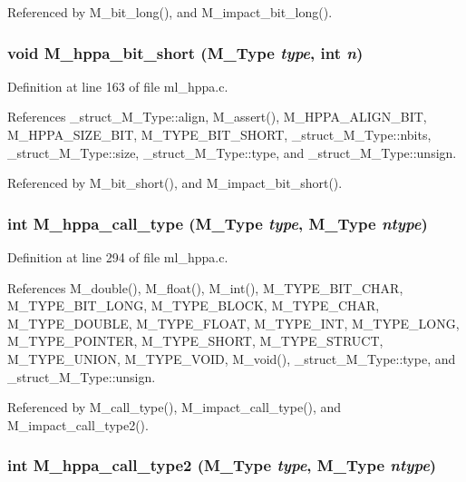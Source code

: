 Referenced by M\_\-bit\_\-long(), and M\_\-impact\_\-bit\_\-long().
\subsubsection{\setlength{\rightskip}{0pt plus 5cm}void M\_\-hppa\_\-bit\_\-short (\bf{M\_\-Type} {\em type}, int {\em n})}\label{ml__hppa_8c_c495d0f8270eaa8cdfd5ea0fda482197}




Definition at line 163 of file ml\_\-hppa.c.

References \_\-struct\_\-M\_\-Type::align, M\_\-assert(), M\_\-HPPA\_\-ALIGN\_\-BIT, M\_\-HPPA\_\-SIZE\_\-BIT, M\_\-TYPE\_\-BIT\_\-SHORT, \_\-struct\_\-M\_\-Type::nbits, \_\-struct\_\-M\_\-Type::size, \_\-struct\_\-M\_\-Type::type, and \_\-struct\_\-M\_\-Type::unsign.

Referenced by M\_\-bit\_\-short(), and M\_\-impact\_\-bit\_\-short().
\subsubsection{\setlength{\rightskip}{0pt plus 5cm}int M\_\-hppa\_\-call\_\-type (\bf{M\_\-Type} {\em type}, \bf{M\_\-Type} {\em ntype})}\label{ml__hppa_8c_659ffb78b03ab7d4c248e6ae8653d368}




Definition at line 294 of file ml\_\-hppa.c.

References M\_\-double(), M\_\-float(), M\_\-int(), M\_\-TYPE\_\-BIT\_\-CHAR, M\_\-TYPE\_\-BIT\_\-LONG, M\_\-TYPE\_\-BLOCK, M\_\-TYPE\_\-CHAR, M\_\-TYPE\_\-DOUBLE, M\_\-TYPE\_\-FLOAT, M\_\-TYPE\_\-INT, M\_\-TYPE\_\-LONG, M\_\-TYPE\_\-POINTER, M\_\-TYPE\_\-SHORT, M\_\-TYPE\_\-STRUCT, M\_\-TYPE\_\-UNION, M\_\-TYPE\_\-VOID, M\_\-void(), \_\-struct\_\-M\_\-Type::type, and \_\-struct\_\-M\_\-Type::unsign.

Referenced by M\_\-call\_\-type(), M\_\-impact\_\-call\_\-type(), and M\_\-impact\_\-call\_\-type2().
\subsubsection{\setlength{\rightskip}{0pt plus 5cm}int M\_\-hppa\_\-call\_\-type2 (\bf{M\_\-Type} {\em type}, \bf{M\_\-Type} {\em ntype})}\label{ml__hppa_8c_2daad82249b0f31bdb3e89f16ad10a38}




